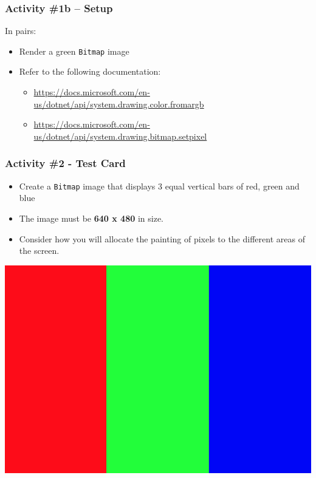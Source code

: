 \begin{frame}
	\frametitle{Activity \#1b -- Setup}
	
	In pairs:
	
	\vspace{2em}
	
	\begin{itemize}		
		\item Render a green \texttt{Bitmap} image
		\item Refer to the following documentation:
		\begin{itemize}
			\item \url{https://docs.microsoft.com/en-us/dotnet/api/system.drawing.color.fromargb}
			\item \url{https://docs.microsoft.com/en-us/dotnet/api/system.drawing.bitmap.setpixel}
		\end{itemize}
	\end{itemize}
\end{frame}

\begin{frame}[fragile]
	\frametitle{Activity \#2 - Test Card}

\begin{itemize}		
	\item Create a \texttt{Bitmap} image that displays 3 equal vertical bars of red, green and blue
	\item The image must be \textbf{640 x 480} in size.
	\item Consider how you will allocate the painting of pixels to the different areas of the screen. 

\end{itemize}
	
\center\includegraphics[scale=0.16]{testCard}

\end{frame}

